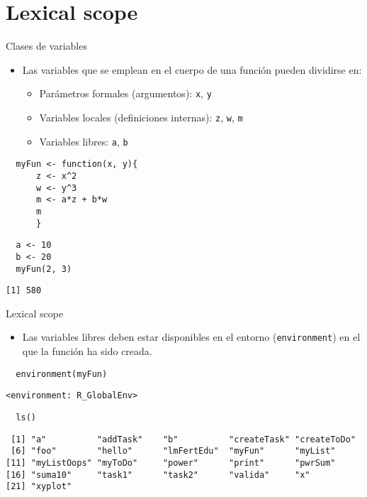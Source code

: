 \documentclass[xcolor={usenames,svgnames,dvipsnames}]{beamer}
\begin{document}
\section{Lexical scope}
\label{sec:orgheadline19}

\begin{frame}[fragile,label={sec:orgheadline13}]{Clases de variables}
 \begin{itemize}
\item Las variables que se emplean en el cuerpo de una función pueden
dividirse en:
\begin{itemize}
\item Parámetros formales (argumentos): \texttt{x}, \texttt{y}
\item Variables locales (definiciones internas): \texttt{z}, \texttt{w}, \texttt{m}
\item Variables libres: \texttt{a}, \texttt{b}
\end{itemize}
\end{itemize}
\lstset{language=R,label= ,caption= ,captionpos=b,numbers=none}
\begin{lstlisting}
  myFun <- function(x, y){
      z <- x^2
      w <- y^3
      m <- a*z + b*w
      m
      }
\end{lstlisting}

\lstset{language=R,label= ,caption= ,captionpos=b,numbers=none}
\begin{lstlisting}
  a <- 10
  b <- 20
  myFun(2, 3)
\end{lstlisting}

\begin{verbatim}
[1] 580
\end{verbatim}
\end{frame}

\begin{frame}[fragile,label={sec:orgheadline14}]{Lexical scope}
 \begin{itemize}
\item Las variables libres deben estar disponibles en el entorno
(\texttt{environment}) en el que la función ha sido creada.
\end{itemize}
\lstset{language=R,label= ,caption= ,captionpos=b,numbers=none}
\begin{lstlisting}
  environment(myFun)
\end{lstlisting}

\begin{verbatim}
<environment: R_GlobalEnv>
\end{verbatim}

\lstset{language=R,label= ,caption= ,captionpos=b,numbers=none}
\begin{lstlisting}
  ls()
\end{lstlisting}

\begin{verbatim}
 [1] "a"          "addTask"    "b"          "createTask" "createToDo"
 [6] "foo"        "hello"      "lmFertEdu"  "myFun"      "myList"    
[11] "myListOops" "myToDo"     "power"      "print"      "pwrSum"    
[16] "suma10"     "task1"      "task2"      "valida"     "x"         
[21] "xyplot"
\end{verbatim}
\end{frame}
\end{document}
